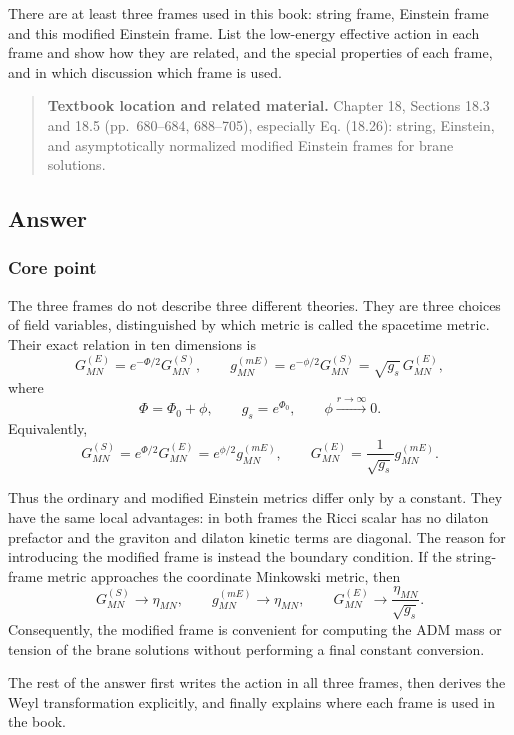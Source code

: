 \documentclass[
  10pt,
  a4paper,
  openany]{book}
\begin{document}
There are at least three frames used in this book: string frame,
Einstein frame and this modified Einstein frame. List the low-energy
effective action in each frame and show how they are related, and the
special properties of each frame, and in which discussion which frame is
used.

\begin{quote}
\textbf{Textbook location and related material.} Chapter 18, Sections
18.3 and 18.5 (pp.~680--684, 688--705), especially Eq. (18.26): string,
Einstein, and asymptotically normalized modified Einstein frames for
brane solutions.
\end{quote}

\subsection{Answer}\label{answer-36}

\subsubsection{Core point}\label{core-point-36}

The three frames do not describe three different theories. They are
three choices of field variables, distinguished by which metric is
called the spacetime metric. Their exact relation in ten dimensions is
\[
\boxed{
G^{(E)}_{MN}=e^{-\Phi/2}G^{(S)}_{MN},
\qquad
g^{(mE)}_{MN}=e^{-\phi/2}G^{(S)}_{MN}
=\sqrt{g_s}\,G^{(E)}_{MN}
},
\] where \[
\Phi=\Phi_0+\phi,
\qquad
g_s=e^{\Phi_0},
\qquad
\phi\xrightarrow{r\to\infty}0.
\] Equivalently, \[
G^{(S)}_{MN}=e^{\Phi/2}G^{(E)}_{MN}
=e^{\phi/2}g^{(mE)}_{MN},
\qquad
G^{(E)}_{MN}=\frac1{\sqrt{g_s}}g^{(mE)}_{MN}.
\]

Thus the ordinary and modified Einstein metrics differ only by a
constant. They have the same local advantages: in both frames the Ricci
scalar has no dilaton prefactor and the graviton and dilaton kinetic
terms are diagonal. The reason for introducing the modified frame is
instead the boundary condition. If the string-frame metric approaches
the coordinate Minkowski metric, then \[
G^{(S)}_{MN}\to\eta_{MN},
\qquad
g^{(mE)}_{MN}\to\eta_{MN},
\qquad
G^{(E)}_{MN}\to\frac{\eta_{MN}}{\sqrt{g_s}}.
\] Consequently, the modified frame is convenient for computing the ADM
mass or tension of the brane solutions without performing a final
constant conversion.

The rest of the answer first writes the action in all three frames, then
derives the Weyl transformation explicitly, and finally explains where
each frame is used in the book.
\end{document}
